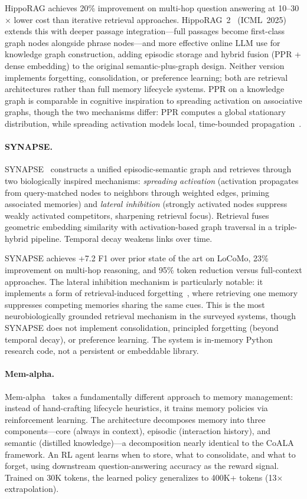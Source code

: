 HippoRAG achieves 20\% improvement on multi-hop question answering at
10--30$\times$ lower cost than iterative retrieval
approaches. HippoRAG~2~\cite{gutierrez2025rag2memory} (ICML~2025)
extends this with deeper passage integration---full passages become
first-class graph nodes alongside phrase nodes---and more effective
online LLM use for knowledge graph construction, adding episodic
storage and hybrid fusion (PPR + dense embedding) to the original
semantic-plus-graph design.  Neither version implements forgetting,
consolidation, or preference learning; both are retrieval
architectures rather than full memory lifecycle systems. PPR on a
knowledge graph is comparable in cognitive inspiration to spreading
activation on associative graphs, though the two mechanisms differ:
PPR computes a global stationary distribution, while spreading
activation models local, time-bounded propagation~\cite{collins1975}.

\paragraph{SYNAPSE.}
SYNAPSE~\cite{jiang2026synapse} constructs a unified episodic-semantic
graph and retrieves through two biologically inspired mechanisms:
\emph{spreading activation} (activation propagates from query-matched
nodes to neighbors through weighted edges, priming associated
memories) and \emph{lateral inhibition} (strongly activated nodes
suppress weakly activated competitors, sharpening retrieval focus).
Retrieval fuses geometric embedding similarity with activation-based
graph traversal in a triple-hybrid pipeline. Temporal decay weakens
links over time.

SYNAPSE achieves +7.2 F1 over prior state of the art on LoCoMo, 23\%
improvement on multi-hop reasoning, and 95\% token reduction versus
full-context approaches. The lateral inhibition mechanism is
particularly notable: it implements a form of retrieval-induced
forgetting~\cite{anderson1994}, where retrieving one memory
suppresses competing memories sharing the same cues. This is the most
neurobiologically grounded retrieval mechanism in the surveyed
systems, though SYNAPSE does not implement consolidation, principled
forgetting (beyond temporal decay), or preference learning. The
system is in-memory Python research code, not a persistent or
embeddable library.

\paragraph{Mem-alpha.}
Mem-alpha~\cite{wang2025memalpha} takes a fundamentally different
approach to memory management: instead of hand-crafting lifecycle
heuristics, it trains memory policies via reinforcement learning.
The architecture decomposes memory into three components---core
(always in context), episodic (interaction history), and semantic
(distilled knowledge)---a decomposition nearly identical to the CoALA
framework. An RL agent learns when to store, what to consolidate,
and what to forget, using downstream question-answering accuracy as
the reward signal. Trained on 30K tokens, the learned policy
generalizes to 400K+ tokens (13$\times$ extrapolation).

